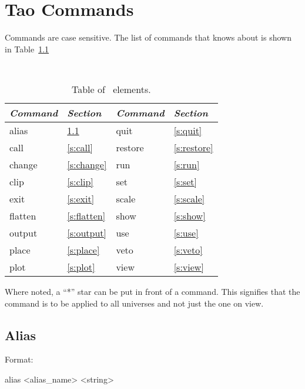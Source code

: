 \chapter{Tao Commands}
\label{c:commands}

Commands are case sensitive. The list of commands that \tao knows
about is shown in Table~\ref{t:commands}

\begin{table}[h]
\centering
{\tt
\begin{tabular}{|l|l||l|l|} \hline
  {\it Command} & {\it Section}  & {\it Command} & {\it Section} \\ \hline
  alias    & \ref{s:alias}    &  quit    & \ref{s:quit}    \\ \hline
  call     & \ref{s:call}     &  restore & \ref{s:restore} \\ \hline
  change   & \ref{s:change}   &  run     & \ref{s:run}     \\ \hline
  clip     & \ref{s:clip}     &  set     & \ref{s:set}     \\ \hline
  exit     & \ref{s:exit}     &  scale   & \ref{s:scale}   \\ \hline
  flatten  & \ref{s:flatten}  &  show    & \ref{s:show}    \\ \hline
  output   & \ref{s:output}   &  use     & \ref{s:use}     \\ \hline
  place    & \ref{s:place}    &  veto    & \ref{s:veto}    \\ \hline
  plot     & \ref{s:plot}     &  view    & \ref{s:view}    \\ \hline
\end{tabular}
}
\caption{Table of \bmad\ elements.}
\label{t:commands}\center
\end{table}

Where noted, a ``*'' star can be put in front of a command. This
signifies that the command is to be applied to all universes and not
just the one on view.

\vfil
\break

\section{Alias}
\label{s:alias}

Format: 
\begin{example}
  alias <alias_name> <string>
\end{example}

\vskip 0.2in

